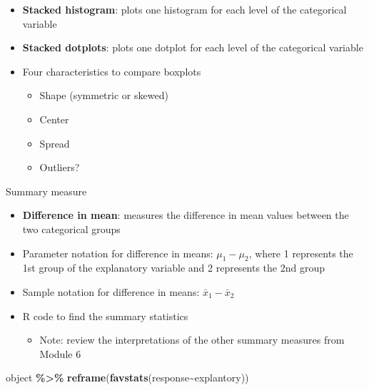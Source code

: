 \documentclass[
]{report}
\newenvironment{Shaded}{\begin{snugshade}}{\end{snugshade}}
\newcommand{\FunctionTok}[1]{\textcolor[rgb]{0.13,0.29,0.53}{\textbf{#1}}}
\newcommand{\NormalTok}[1]{#1}
\newcommand{\SpecialCharTok}[1]{\textcolor[rgb]{0.81,0.36,0.00}{\textbf{#1}}}
\providecommand{\tightlist}{%
  \setlength{\itemsep}{0pt}\setlength{\parskip}{0pt}}
\begin{document}
\begin{itemize}
\item
  \textbf{Stacked histogram}: plots one histogram for each level of the categorical variable
\item
  \textbf{Stacked dotplots}: plots one dotplot for each level of the categorical variable
\item
  Four characteristics to compare boxplots

  \begin{itemize}
  \item
    Shape (symmetric or skewed)
  \item
    Center
  \item
    Spread
  \item
    Outliers?
  \end{itemize}
\end{itemize}

Summary measure

\begin{itemize}
\item
  \textbf{Difference in mean}: measures the difference in mean values between the two categorical groups
\item
  Parameter notation for difference in means: \(\mu_1 - \mu_2\), where 1 represents the 1st group of the explanatory variable and 2 represents the 2nd group
\item
  Sample notation for difference in means: \(\bar{x}_1 - \bar{x}_2\)
\end{itemize}

\vspace{1mm}

\begin{itemize}
\item
  R code to find the summary statistics

  \begin{itemize}
  \tightlist
  \item
    Note: review the interpretations of the other summary measures from Module 6
  \end{itemize}
\end{itemize}

\begin{Shaded}
\begin{Highlighting}[]
\NormalTok{object }\SpecialCharTok{\%\textgreater{}\%}
  \FunctionTok{reframe}\NormalTok{(}\FunctionTok{favstats}\NormalTok{(response}\SpecialCharTok{\textasciitilde{}}\NormalTok{explantory))}
\end{Highlighting}
\end{Shaded}
\end{document}
